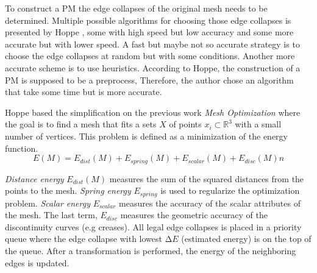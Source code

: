 To construct a PM the edge collapses of the original mesh needs to be determined. Multiple possible algorithms for choosing those edge collapses is presented by Hoppe \cite{hoppe1996progressive}, some with high speed but low accuracy and some more accurate but with lower speed. A fast but maybe not so accurate strategy is to choose the edge collapses at random but with some conditions. Another more accurate scheme is to use heuristics. According to Hoppe, the construction of a PM is supposed to be a preprocess, Therefore, the author chose an algorithm that take some time but is more accurate.

Hoppe based the simplification on the previous work \emph{Mesh Optimization} \cite{hoppe1993mesh} where the goal is to find a mesh that fits a sets $X$ of points \(x_i \subset \mathbb{R}^3\) with a small number of vertices. This problem is defined as a minimization of the energy function.
\begin{equation}
  E(M) = E_{dist}(M) + E_{spring}(M) + E_{scalar}(M) + E_{disc}(M)n
\end{equation}

\emph{Distance energy} $E_{dist}(M)$ measures the sum of the squared distances from the points to the mesh. \emph{Spring energy} $E_{spring}$ is used to regularize the optimization problem. \emph{Scalar energy} $E_{scalar}$ measures the accuracy of the scalar attributes of the mesh. The last term, $E_{disc}$ measures the geometric accuracy of the discontinuity curves (e.g creases). All legal edge collapses is placed in a priority queue where the edge collapse with lowest $\mathup\Delta E$ (estimated energy) is on the top of the queue. After a transformation is performed, the energy of the neighboring edges is updated.

